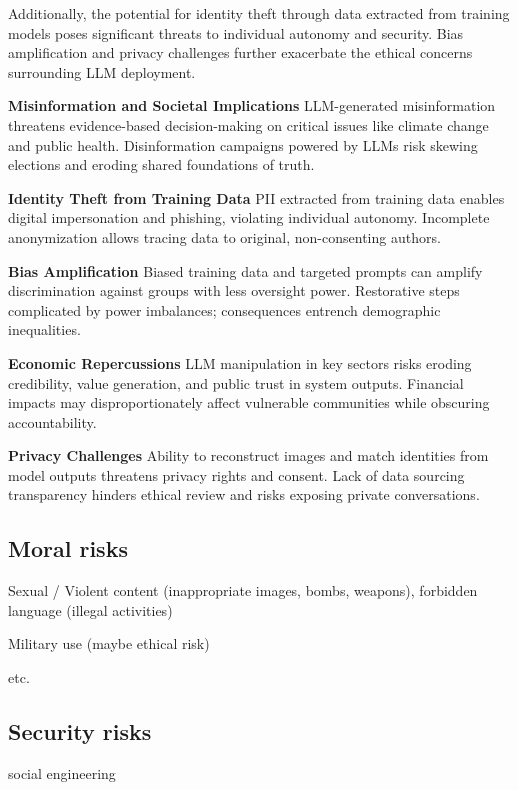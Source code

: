 Additionally, the potential for identity theft through data extracted from training models poses significant threats to individual autonomy and security. Bias amplification and privacy challenges further exacerbate the ethical concerns surrounding LLM deployment.

\textbf{Misinformation and Societal Implications}
LLM-generated misinformation threatens evidence-based decision-making on critical issues like climate change and public health. 
Disinformation campaigns powered by LLMs risk skewing elections and eroding shared foundations of truth. 

\textbf{Identity Theft from Training Data}
PII extracted from training data enables digital impersonation and phishing, violating individual autonomy. 
Incomplete anonymization allows tracing data to original, non-consenting authors. 

\textbf{Bias Amplification}
Biased training data and targeted prompts can amplify discrimination against groups with less oversight power. 
Restorative steps complicated by power imbalances; consequences entrench demographic inequalities. 

\textbf{Economic Repercussions} 
LLM manipulation in key sectors risks eroding credibility, value generation, and public trust in system outputs. 
Financial impacts may disproportionately affect vulnerable communities while obscuring accountability. 

\textbf{Privacy Challenges}
Ability to reconstruct images and match identities from model outputs threatens privacy rights and consent. 
Lack of data sourcing transparency hinders ethical review and risks exposing private conversations. 






\subsection{Moral risks}
Sexual / Violent content (inappropriate images, bombs, weapons), forbidden language (illegal activities)

Military use (maybe ethical risk)

etc.

\subsection{Security risks}
social engineering

